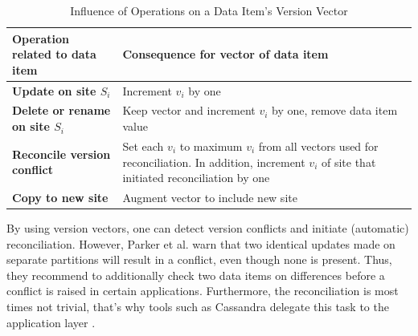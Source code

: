 \begin{table}[ht]
    \centering
    \begin{tabularx}{\linewidth}{@{}>{\bfseries}l@{\hspace{.5em}}X@{}}
        \toprule
        \textbf{Operation related to data item} & \textbf{Consequence for vector of data item}\\ \midrule
        Update on site $S_i$ & Increment $v_i$ by one\\
        Delete or rename on site $S_i$ & Keep vector and increment $v_i$ by one, remove data item value\\
        Reconcile version conflict & Set each $v_i$ to maximum $v_i$ from all vectors used for reconciliation. In addition, increment $v_i$ of site that initiated reconciliation by one\\
        Copy to new site & Augment vector to include new site\\
        \bottomrule
    \end{tabularx}
    \caption{Influence of Operations on a Data Item's Version Vector}
    \label{tab:vectorOperations}
\end{table}

By using version vectors, one can detect version conflicts and initiate (automatic) reconciliation. However, Parker et al. warn that two identical updates made on separate partitions will result in a conflict, even though none is present. Thus, they recommend to additionally check two data items on differences before a conflict is raised in certain applications. Furthermore, the reconciliation is most times not trivial, that's why tools such as Cassandra delegate this task to the application layer \cite{cassandra2010}.
